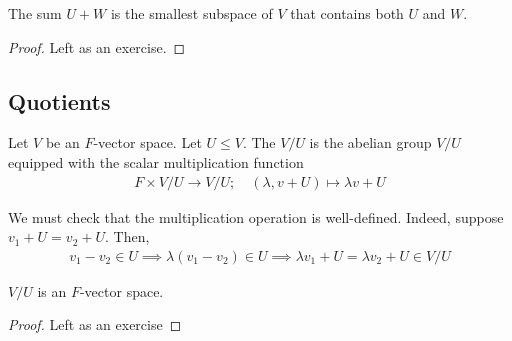     \begin{proposition}
        The sum $U + W$ is the smallest subspace of $V$ that contains both $U$ and $W$.
    \end{proposition}

    \begin{proof}
        Left as an exercise.
    \end{proof} 

    \subsection{Quotients}
    \begin{definition}[Quotient]
        Let $V$ be an $F$-vector space.
        Let $U \leq V$.
        The  $V / U$ is the abelian group $V / U$ equipped with the scalar multiplication function
        \begin{align*}
            F \times V / U \to V / U;\quad (\lambda, v + U) \mapsto \lambda v + U
        \end{align*}
    \end{definition}

    \begin{note}
        We must check that the multiplication operation is well-defined.
        Indeed, suppose $v_1 + U = v_2 + U$.
        Then,
        \begin{align*}
            v_1 - v_2 \in U \implies \lambda (v_1 - v_2) \in U \implies \lambda v_1 + U = \lambda v_2 + U \in V / U
        \end{align*}
    \end{note} 
    \begin{proposition}
        $V / U$ is an $F$-vector space.
    \end{proposition}
    \begin{proof}
        Left as an exercise        
    \end{proof}

